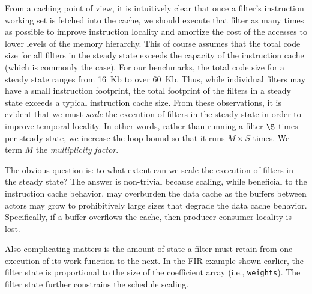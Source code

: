 From a caching point of view, it is intuitively clear that once a
filter's instruction working set is fetched into the cache, we should
execute that filter as many times as possible to improve instruction
locality and amortize the cost of the accesses to lower levels of the
memory hierarchy. This of course assumes that the total code size for
all filters in the steady state exceeds the capacity of the
instruction cache (which is commonly the case).
For our benchmarks, the total code size for a steady state
ranges from 16~Kb to over 60~Kb. Thus, while individual filters may have a
small instruction footprint, the total footprint of the filters in a
steady state exceeds a typical instruction cache size.
From these observations, it is evident that we must {\it scale} the
execution of filters in the steady state in order to improve temporal
locality. In other words, rather than running a filter $\S$ times per
steady state, we increase the loop bound so that it runs $M \times S$ 
times.
We term $M$ the {\it multiplicity factor}.

The obvious question is: to what extent can we scale the execution of
filters in the steady state? The answer is non-trivial because
scaling, while beneficial to the instruction cache behavior, may
overburden the data cache as the buffers between actors may grow to
prohibitively large sizes that degrade the data cache
behavior. Specifically, if a buffer overflows the cache, then
producer-consumer locality is lost. 

Also complicating matters is the amount of state a filter must retain
from one execution of its work function to the next. In the FIR
example shown earlier, the filter state is proportional to the size of
the coefficient array (i.e., \texttt{weights}). The filter state
further constrains the schedule scaling.
